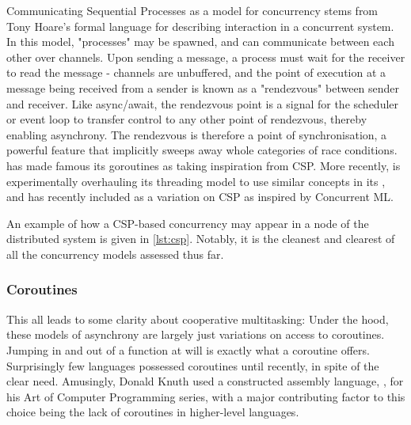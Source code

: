 Communicating Sequential Processes as a model for concurrency stems from Tony Hoare's formal language for describing interaction in a concurrent system\cite{hoare1978communicating}.
In this model, "processes" may be spawned, and can communicate between each other over channels.
Upon sending a message, a process must wait for the receiver to read the message - channels are unbuffered, and the point of execution at a message being received from a sender is known as a "rendezvous" between sender and receiver.
Like async/await, the rendezvous point is a signal for the scheduler or event loop to transfer control to any other point of rendezvous, thereby enabling asynchrony.
The rendezvous is therefore a point of synchronisation, a powerful feature that implicitly sweeps away whole categories of race conditions.
 has made famous its goroutines as taking inspiration from CSP\cite{gomem2014}.
More recently,  is experimentally overhauling its threading model to use similar concepts in its , and  has recently included  as a variation on CSP as inspired by Concurrent ML.

An example of how a CSP-based concurrency may appear in a node of the distributed system is given in \cref{lst:csp}.
Notably, it is the cleanest and clearest of all the concurrency models assessed thus far.


\subsubsection{Coroutines}

This all leads to some clarity about cooperative multitasking: Under the hood, these models of asynchrony are largely just variations on access to coroutines.
Jumping in and out of a function at will is exactly what a coroutine offers.
Surprisingly few languages possessed coroutines until recently, in spite of the clear need.
Amusingly, Donald Knuth used a constructed assembly language, , for his Art of Computer Programming series, with a major contributing factor to this choice being the lack of coroutines in higher-level languages\cite{knuth1}.
